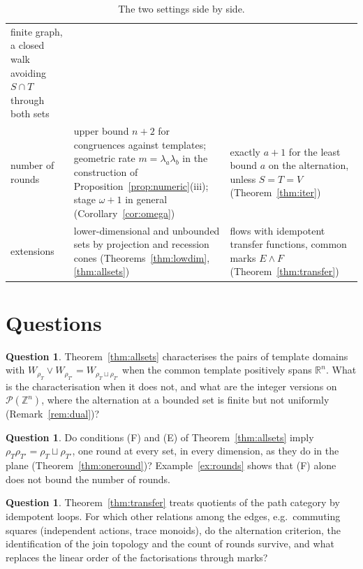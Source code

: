 \documentclass[11pt]{amsart}
\theoremstyle{definition}
\newtheorem{que}[thm]{Question}
\newcommand{\cP}{\mathcal P}
\begin{document}
\begin{table}[tp]
\begin{tabular}{@{}>{\raggedright\arraybackslash}p{}>{\raggedright\arraybackslash}p{}>{\raggedright\arraybackslash}p{}@{}}
 finite graph, a closed walk avoiding $S\cap T$ through both sets\\
number of rounds & upper bound $n+2$ for congruences against templates;
 geometric rate $m=\lambda_a\lambda_b$ in the construction of
 Proposition~\ref{prop:numeric}(iii); stage $\omega+1$ in general
 (Corollary~\ref{cor:omega}) & exactly $a+1$ for the least bound $a$ on
 the alternation, unless $S=T=V$ (Theorem~\ref{thm:iter})\\
extensions & lower-dimensional and unbounded sets by projection and
 recession cones (Theorems~\ref{thm:lowdim}, \ref{thm:allsets}) & flows
 with idempotent transfer functions, common marks $E\wedge F$
 (Theorem~\ref{thm:transfer})\\
\hline
\end{tabular}
\caption{The two settings side by side.}\label{tab:sum}
\end{table}
\FloatBarrier

\section{Questions}

\begin{que}
Theorem~\ref{thm:allsets} characterises the pairs of template domains
with $W_{\rho_T}\vee W_{\rho_{T'}}=W_{\rho_T\sqcup\rho_{T'}}$ when the
common template positively spans $\mathbb R^n$. What is the
characterisation when it does not, and what are the integer versions on
$\cP(\mathbb Z^n)$, where the alternation at a bounded set is finite but
not uniformly (Remark~\ref{rem:dual})?
\end{que}

\begin{que}\label{que:uniform}
Do conditions (F) and (E) of Theorem~\ref{thm:allsets} imply $\rho_T
\rho_{T'}=\rho_T\sqcup\rho_{T'}$, one round at every set, in every
dimension, as they do in the plane (Theorem~\ref{thm:oneround})?
Example~\ref{ex:rounds} shows that (F) alone does not bound the number
of rounds.
\end{que}

\begin{que}
Theorem~\ref{thm:transfer} treats quotients of the path category by
idempotent loops. For which other relations among the edges, e.g.\
commuting squares (independent actions, trace monoids), do the
alternation criterion, the identification of the join topology and the
count of rounds survive, and what replaces the linear order of the
factorisations through marks?
\end{que}
\end{document}
